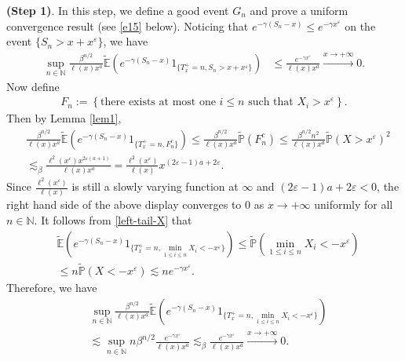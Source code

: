 \documentclass[11pt]{article}
\numberwithin{equation}{section}
\begin{document}
\noindent
{\bf(Step 1)}. In this step, we define a good event $G_n$ and prove a uniform convergence result (see \eqref{e15} below). 
Noticing that $e^{-\gamma (S_n-x)}\leq e^{-\gamma x^{\varepsilon}}$ on the event $\{S_n>x+x^\varepsilon\}$, we have 
\begin{align}\label{e15-1}
	\sup_{n\in \mathbb{N}} \frac{  \beta^{n/2}  }{\ell(x) x^a} \widetilde{\mathbb{E}}\left(e^{-\gamma (S_n-x)}1_{\{T_x^+=n, S_n> x+ x^{\varepsilon}\}}\right) & \leq 	\frac{  e^{-\gamma x^{\varepsilon}} }{\ell(x) x^a} \stackrel{x\to+\infty}{\longrightarrow}0.  
\end{align}
Now define 
\begin{align}\label{def-of-F}
	F_n:= \left\{ \mbox{there exists at most one }i \leq n \mbox{ such that } X_i>x^\varepsilon \right\}.
\end{align}
Then by Lemma \ref{lem1},
\begin{align}\label{e15-2}
	& \frac{  \beta^{n/2}  }{\ell(x) x^a} \widetilde{\mathbb{E}}\left(e^{-\gamma (S_n-x)}1_{\{T_x^+=n, F_n^c\}}\right)  \leq 	\frac{  \beta^{n/2}  }{\ell(x) x^a}  \widetilde{\mathbb{P}}\left(  F_n^c \right)  \leq  \frac{\beta^{n/2} n^2 }{\ell(x) x^a}\widetilde{\mathbb{P}}\left( X>x^\varepsilon \right)^2 \nonumber\\
	& \lesssim_\beta \frac{\ell^2(x^{\varepsilon}) x^{2\varepsilon(a+1)}}{\ell(x) x^a}  = \frac{\ell^2(x^{\varepsilon}) }{\ell(x) } x^{(2\varepsilon-1)a + 2\varepsilon}.
\end{align}
Since $\frac{\ell^2(x^{\varepsilon}) }{\ell(x) } $ is still a slowly varying function at $\infty$ and $(2\varepsilon-1)a + 2\varepsilon<0$, the right hand side of the above display converges to $0$ as $x\to+\infty$ uniformly for all $n\in \mathbb{N}$. 
It follows from \eqref{left-tail-X} that
\begin{align}\label{e15-4}
	&\widetilde{\mathbb{E}}\left(e^{-\gamma (S_n-x)}1_{\{T_x^+=n, \min_{1\leq i\leq n} X_i <-x^{\varepsilon}\}}\right)  \leq  \widetilde{\mathbb{P}}\left( \min_{1\leq i\leq n} X_i< -x^{\varepsilon}\right)\nonumber\\
	& \leq n \widetilde{\mathbb{P}}\left(X<-x^{\varepsilon}\right) \lesssim  ne^{-\gamma x^{\varepsilon}} .
\end{align}
Therefore, we have 
\begin{align}\label{e15-3}
	& \sup_{n\in \mathbb{N}}\frac{ \beta^{n/2} }{\ell(x) x^a}\widetilde{\mathbb{E}}\left(e^{-\gamma (S_n-x)}1_{\{T_x^+=n, \min_{1\leq i\leq n} X_i < -x^{\varepsilon}\}}\right)  \nonumber\\
	&\lesssim  \sup_{n\in \mathbb{N}} n \beta^{n/2}  \frac{e^{-\gamma x^{\varepsilon}}}{\ell(x)x^a} \lesssim_\beta \frac{e^{-\gamma x^{\varepsilon}}}{\ell(x)x^a}\stackrel{x\to+\infty}{\longrightarrow}0. 
\end{align}
\end{document}
